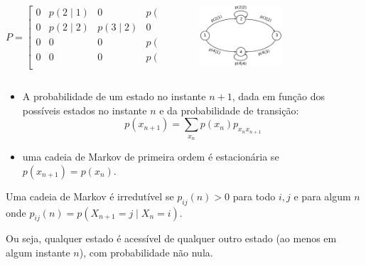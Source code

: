 \begin{frame}[allowframebreaks]
   \framebreak

   \begin{columns}
   \begin{column}{0.5\textwidth}
	\begin{equation}
	P = \begin{bmatrix}
		0 & p(2 \mid 1) & 0 & p(4 \mid 1) \\
		0 & p(2 \mid 2) & p(3 \mid 2) & 0 \\
		0 & 0 & 0 & p(4 \mid 3) \\
		0 & 0 & 0 & p(4 \mid 4) \\
		\end{bmatrix}
	\end{equation}
   \end{column}
   \begin{column}{0.5\textwidth}
	\begin{figure}[h!]
	\centering
	\includegraphics[width=0.6\textwidth]{images/markov-example.pdf}
	\label{fig:markov-example}
	\end{figure}
   \end{column}
   \end{columns}
 
   \begin{itemize}
   \item A probabilidade de um estado no instante $n+1$, dada em função dos possíveis estados no instante $n$ e da probabilidade de transição:
	\begin{equation}
	p(x_{n+1}) = \sum_{x_n} p(x_n) p_{x_n  x_{n+1}}
	\end{equation}
   \item uma cadeia de Markov de primeira ordem é estacionária se $p(x_{n+1}) = p(x_n)$.
   \end{itemize}

   \framebreak

   \begin{definition}[Irredutível]
   Uma cadeia de Markov é irredutível se $p_{ij}(n) > 0$ para todo $i,j$ e para algum $n$ onde
   $p_{ij}(n) = p(X_{n+1} = j \mid X_{n} = i)$.
   \end{definition}
   Ou seja, qualquer estado é acessível de qualquer outro estado (ao menos em algum instante $n$),
   com probabilidade não nula.


\end{frame}
